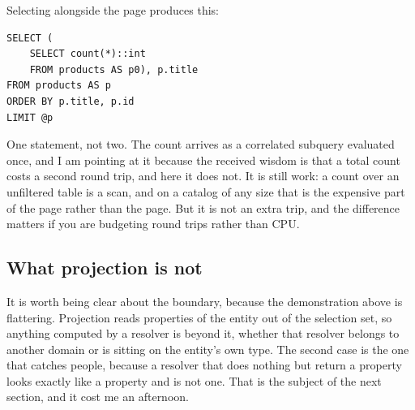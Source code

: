 %
Selecting  alongside the page produces this:

\begin{verbatim}
SELECT (
    SELECT count(*)::int
    FROM products AS p0), p.title
FROM products AS p
ORDER BY p.title, p.id
LIMIT @p
\end{verbatim}

One statement, not two. The count arrives as a correlated subquery evaluated
once, and I am pointing at it because the received wisdom is that a total count
costs a second round trip, and here it does not. It is still work: a count over
an unfiltered table is a scan, and on a catalog of any size that is the
expensive part of the page rather than the page. But it is not an extra trip,
and the difference matters if you are budgeting round trips rather than CPU.

\subsection*{What projection is not}

%
It is worth being clear about the boundary, because the demonstration above is
flattering. Projection reads properties of the entity out of the selection set,
so anything computed by a resolver is beyond it, whether that resolver belongs
to another domain or is sitting on the entity's own type. The second case is the
one that catches people, because a resolver that does nothing but return a
property looks exactly like a property and is not one. That is the subject of
the next section, and it cost me an afternoon.
